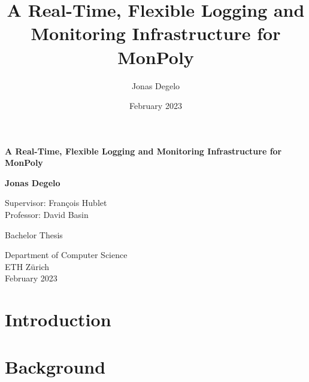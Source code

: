 \documentclass{article}
\title{A Real-Time, Flexible Logging and Monitoring Infrastructure for MonPoly}
\author{Jonas Degelo}
\date{February 2023}
\begin{document}
\begin{titlepage}
    \begin{center}
        \vspace*{1cm}
            
        \Huge
        \textbf{A Real-Time, Flexible Logging and Monitoring Infrastructure for MonPoly}
            
        \vspace{0.5cm}
        \LARGE
            
        \vspace{1.5cm}
            
        \textbf{Jonas Degelo}
        
        \vspace{1.5cm}
        
        Supervisor: François Hublet \\
        Professor: David Basin
            
        \vfill
        Bachelor Thesis
        \vspace{0.8cm}
            
        \Large
        Department of Computer Science\\
        ETH Zürich\\
        February 2023
            
    \end{center}
\end{titlepage}


\section{Introduction}
\section{Background}
\end{document}
